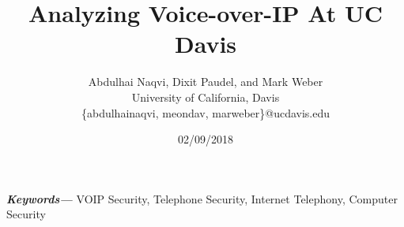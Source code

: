 \documentclass[letterpaper,twocolumn,10pt]{article}
\date{}
\begin{document}
\title{ Analyzing Voice-over-IP At UC Davis}
\date{ 02/09/2018 }
\author{Abdulhai Naqvi, Dixit Paudel, and Mark Weber\\
University of California, Davis\\
\{abdulhainaqvi, meondav, marweber\}@ucdavis.edu}


\maketitle

% 
% 
% 
% 
% 
\providecommand{\keywords}[1]{\textbf{\textit{Keywords---}} #1}
\keywords{VOIP Security, Telephone Security, Internet Telephony, Computer Security}


% 


% 
% 
% 


\end{document}
